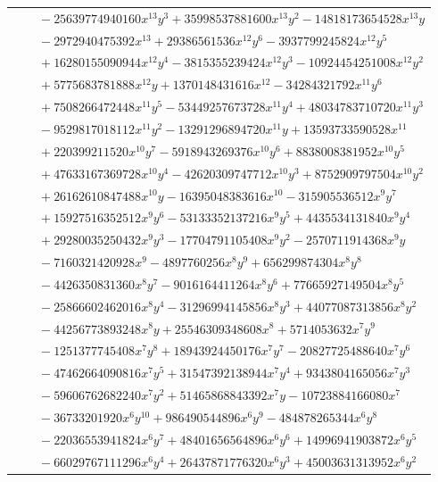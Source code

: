 \documentclass[11pt]{article}
\begin{document}
\begin{longtable}{@{}ll@{}}
 & $\quad -25639774940160x^{13}y^{3}+35998537881600x^{13}y^{2}-14818173654528x^{13}y$\\
 & $\quad -2972940475392x^{13}+29386561536x^{12}y^{6}-3937799245824x^{12}y^{5}$\\
 & $\quad +16280155090944x^{12}y^{4}-3815355239424x^{12}y^{3}-10924454251008x^{12}y^{2}$\\
 & $\quad +5775683781888x^{12}y+1370148431616x^{12}-34284321792x^{11}y^{6}$\\
 & $\quad +7508266472448x^{11}y^{5}-53449257673728x^{11}y^{4}+48034783710720x^{11}y^{3}$\\
 & $\quad -9529817018112x^{11}y^{2}-13291296894720x^{11}y+13593733590528x^{11}$\\
 & $\quad +220399211520x^{10}y^{7}-5918943269376x^{10}y^{6}+8838008381952x^{10}y^{5}$\\
 & $\quad +47633167369728x^{10}y^{4}-42620309747712x^{10}y^{3}+8752909797504x^{10}y^{2}$\\
 & $\quad +26162610847488x^{10}y-16395048383616x^{10}-315905536512x^{9}y^{7}$\\
 & $\quad +15927516352512x^{9}y^{6}-53133352137216x^{9}y^{5}+4435534131840x^{9}y^{4}$\\
 & $\quad +29280035250432x^{9}y^{3}-17704791105408x^{9}y^{2}-2570711914368x^{9}y$\\
 & $\quad -7160321420928x^{9}-4897760256x^{8}y^{9}+656299874304x^{8}y^{8}$\\
 & $\quad -4426350831360x^{8}y^{7}-9016164411264x^{8}y^{6}+77665927149504x^{8}y^{5}$\\
 & $\quad -25866602462016x^{8}y^{4}-31296994145856x^{8}y^{3}+44077087313856x^{8}y^{2}$\\
 & $\quad -44256773893248x^{8}y+25546309348608x^{8}+5714053632x^{7}y^{9}$\\
 & $\quad -1251377745408x^{7}y^{8}+18943924450176x^{7}y^{7}-20827725488640x^{7}y^{6}$\\
 & $\quad -47462664090816x^{7}y^{5}+31547392138944x^{7}y^{4}+9343804165056x^{7}y^{3}$\\
 & $\quad -59606762682240x^{7}y^{2}+51465868843392x^{7}y-10723884166080x^{7}$\\
 & $\quad -36733201920x^{6}y^{10}+986490544896x^{6}y^{9}-484878265344x^{6}y^{8}$\\
 & $\quad -22036553941824x^{6}y^{7}+48401656564896x^{6}y^{6}+14996941903872x^{6}y^{5}$\\
 & $\quad -66029767111296x^{6}y^{4}+26437871776320x^{6}y^{3}+45003631313952x^{6}y^{2}$\\

\end{longtable}
\end{document}
